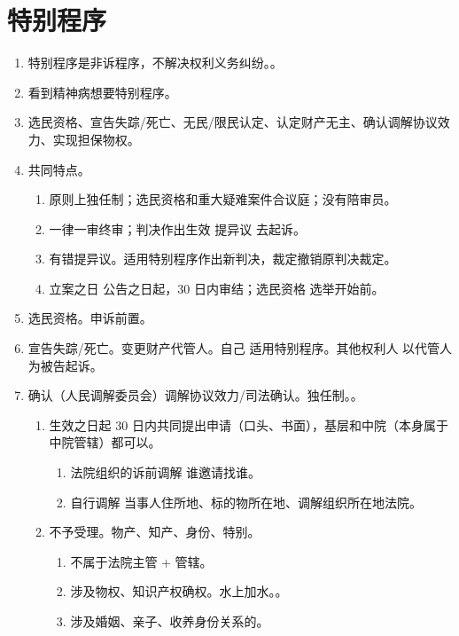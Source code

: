 \section{特别程序}
\begin{enumerate}
  \item 特别程序是非诉程序，不解决权利义务纠纷。。
  \item 看到精神病想要特别程序。
  \item 选民资格、宣告失踪/死亡、无民/限民认定、认定财产无主、确认调解协议效力、实现担保物权。
  \item 共同特点。
        \begin{enumerate}
          \item 原则上独任制；选民资格和重大疑难案件合议庭；没有陪审员。
          \item 一律一审终审；判决作出生效 \yjt 提异议 \hz 去起诉。
          \item 有错提异议。适用特别程序作出新判决，裁定撤销原判决裁定。
          \item 立案之日 \hz 公告之日起，30 日内审结；选民资格 \yjt 选举开始前。
        \end{enumerate}
  \item 选民资格。申诉前置。
  \item 宣告失踪/死亡。变更财产代管人。\yi 自己 \yjt 适用特别程序。\er 其他权利人 \yjt 以代管人为被告起诉。
  \item 确认（人民调解委员会）调解协议效力/司法确认。独任制。。
        \begin{enumerate}
          \item 生效之日起 30 日内共同提出申请（口头、书面），基层和中院（本身属于中院管辖）都可以。
                \begin{enumerate}
                  \item 法院组织的诉前调解 \yjt 谁邀请找谁。
                  \item 自行调解 \yjt 当事人住所地、标的物所在地、调解组织所在地法院。
                \end{enumerate}
          \item 不予受理。物产、知产、身份、特别。
                \begin{enumerate}
                  \item 不属于法院主管 + 管辖。
                  \item 涉及物权、知识产权确权。水上加水。。
                  \item 涉及婚姻、亲子、收养身份关系的。

\end{enumerate}
\end{enumerate}
\end{enumerate}
